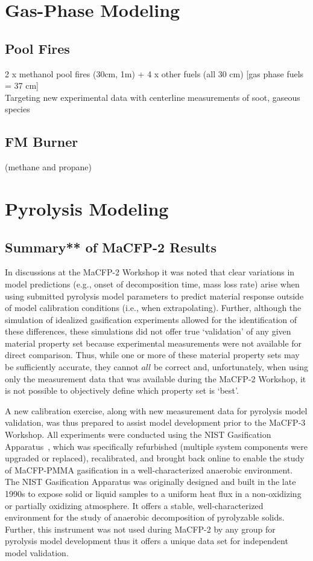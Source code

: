 \documentclass[12pt]{article}
\begin{document}
\clearpage
\section{Gas-Phase Modeling}
\subsection{Pool Fires}
2 x methanol pool fires (30cm, 1m) + 4 x other fuels (all 30 cm) [gas phase fuels = 37 cm]\\
Targeting new experimental data with centerline measurements of soot, gaseous species

\subsection{FM Burner}
(methane and propane)


\clearpage
\section{Pyrolysis Modeling}
\label{Pyrolysis Modeling}
\subsection{Summary** of MaCFP-2 Results}
In discussions at the MaCFP-2 Workshop it was noted that clear variations in model predictions (e.g., onset of decomposition time, mass loss rate) arise when using submitted pyrolysis model parameters to predict material response outside of model calibration conditions (i.e., when extrapolating). Further, although the simulation of idealized gasification experiments allowed for the identification of these differences, these simulations did not offer true `validation' of any given material property set because experimental measurements were not available for direct comparison. Thus, while one or more of these material property sets may be sufficiently accurate, they cannot $all$ be correct and, unfortunately, when using only the measurement data that was available during the MaCFP-2 Workshop, it is not possible to objectively define which property set is `best'.

A new calibration exercise, along with new measurement data for pyrolysis model validation, was thus prepared to assist model development prior to the MaCFP-3 Workshop. All experiments were conducted using the NIST Gasification Apparatus~\cite{austin1998gasification}, which was specifically refurbished (multiple system components were upgraded or replaced), recalibrated, and brought back online to enable the study of MaCFP-PMMA gasification in a well-characterized anaerobic environment. The NIST Gasification Apparatus was originally designed and built in the late 1990s to expose solid or liquid samples to a uniform heat flux in a non-oxidizing or partially oxidizing atmosphere. It offers a stable, well-characterized environment for the study of anaerobic decomposition of pyrolyzable solids. Further, this instrument was not used during MaCFP-2 by any group for pyrolysis model development thus it offers a unique data set for independent model validation.
\end{document}
